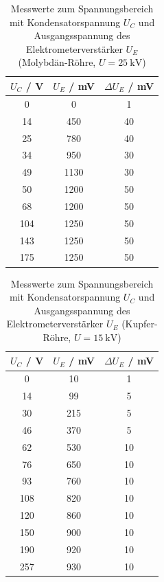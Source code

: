 \documentclass{article}
\begin{document}
\begin{table}[H]
    \centering
    \caption{Messwerte zum Spannungsbereich mit Kondensatorspannung $U_C$ und Ausgangsspannung des Elektrometerverstärker $U_E$ (Molybdän-Röhre, $U = \SI{25}{\kilo\volt}$)}
    \begin{tabular}{|c|c|c|}
        \hline
        $U_C$ / \si{\volt} & $U_E$ / \si{\milli\volt} & $\Delta U_E$ / \si{\milli\volt} \\ \hline \hline
         0 & 0 & 1 \\ \hline
         14 & 450 & 40 \\ \hline
         25 & 780 & 40 \\ \hline
         34 & 950 & 30 \\ \hline
         49 & 1130 & 30 \\ \hline
         50 & 1200 & 50 \\ \hline
         68 & 1200 & 50 \\ \hline
         104 & 1250 & 50 \\ \hline
         143 & 1250 & 50 \\ \hline
         175 & 1250 & 50 \\ \hline
    \end{tabular}
    \label{tab:MesswerteDosimetrie1c}
\end{table}

\begin{table}[H]
    \centering
    \caption{Messwerte zum Spannungsbereich mit Kondensatorspannung $U_C$ und Ausgangsspannung des Elektrometerverstärker $U_E$ (Kupfer-Röhre, $U = \SI{15}{\kilo\volt}$)}
    \begin{tabular}{|c|c|c|}
        \hline
        $U_C$ / \si{\volt} & $U_E$ / \si{\milli\volt} & $\Delta U_E$ / \si{\milli\volt} \\ \hline \hline
         0 & 10 & 1 \\ \hline
         14 & 99 & 5 \\ \hline
         30 & 215 & 5 \\ \hline
         46 & 370 & 5 \\ \hline
         62 & 530 & 10 \\ \hline
         76 & 650 & 10 \\ \hline
         93 & 760 & 10 \\ \hline
         108 & 820 & 10 \\ \hline
         120 & 860 & 10 \\ \hline
         150 & 900 & 10 \\ \hline
         190 & 920 & 10 \\ \hline
         257 & 930 & 10 \\ \hline
    \end{tabular}
    \label{tab:MesswerteDosimetrie1d}
\end{table}
\end{document}
